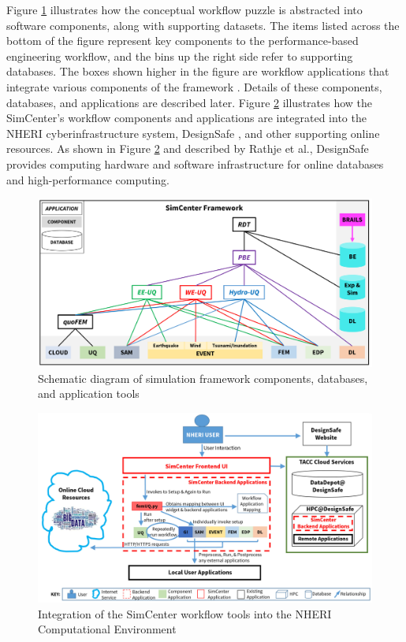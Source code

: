 Figure \ref{fig:intro_SimCenter_tools} illustrates how the conceptual workflow puzzle is abstracted into software components, along with supporting datasets.  The items listed across the bottom of the figure represent key components to the performance-based engineering workflow, and the bins up the right side refer to supporting databases.  The boxes shown higher in the figure are workflow applications that integrate various components of the framework \citep{mckenna2020simcenter}.  Details of these components, databases, and applications are described later.  Figure \ref{fig:intro_SimCenter_integration} illustrates how the SimCenter’s workflow components and applications are integrated into the NHERI cyberinfrastructure system, DesignSafe \citep{rathje2017designsafe}, and other supporting online resources.  As shown in Figure \ref{fig:intro_SimCenter_integration} and described by Rathje et al., DesignSafe provides computing hardware and software infrastructure for online databases and high-performance computing.

\begin{figure}[htb]
    \centering
    \includegraphics[width=1.0\textwidth, angle = 0]{Figures/SimCenter_tools.png}
    \caption{Schematic diagram of simulation framework components, databases, and application tools}
    \label{fig:intro_SimCenter_tools}
\end{figure}

\begin{figure}[htb]
    \centering
    \includegraphics[width=1.0\textwidth, angle = 0]{Figures/SimCenter_integration.png}
    \caption{Integration of the SimCenter workflow tools into the NHERI Computational Environment}
    \label{fig:intro_SimCenter_integration}
\end{figure}

